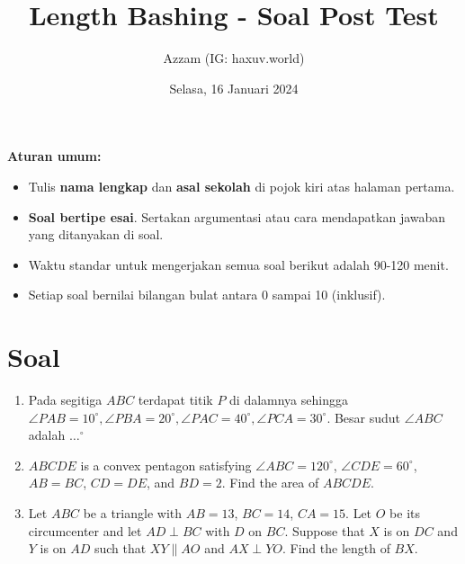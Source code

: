 \documentclass[11pt]{scrartcl}
\title{Length Bashing - Soal Post Test}
\author{Azzam (IG: haxuv.world)}
\date{Selasa, 16 Januari 2024}
\begin{document}
\maketitle
\textbf{Aturan umum:}
\begin{itemize}
    \item Tulis \textbf{nama lengkap} dan \textbf{asal sekolah} di pojok kiri atas halaman pertama.
    \item \textbf{Soal bertipe esai}. Sertakan argumentasi atau cara mendapatkan jawaban yang ditanyakan di soal.
    \item Waktu standar untuk mengerjakan semua soal berikut adalah 90-120 menit.
    \item Setiap soal bernilai bilangan bulat antara 0 sampai 10 (inklusif).
\end{itemize}


\section{Soal}
\begin{enumerate}
    \item Pada segitiga $ABC$ terdapat titik $P$ di dalamnya sehingga $\angle PAB = 10^\circ, \angle PBA = 20^\circ , \angle PAC = 40^\circ, \angle PCA = 30^\circ$. Besar sudut $\angle ABC$ adalah $\dots^\circ$ 
    
    \item $ABCDE$ is a convex pentagon satisfying $\angle ABC = 120^\circ$, $\angle CDE = 60^\circ$, $AB = BC$, $CD = DE$, and $BD = 2$. Find the area of $ABCDE$.

    \item Let $ABC$ be a triangle with $AB = 13$, $BC = 14$, $CA = 15$. Let $O$ be its circumcenter and let $AD \perp BC$ with $D$ on $BC$. Suppose that $X$ is on $DC$ and $Y$ is on $AD$ such that $XY \parallel AO$ and $AX \perp YO$. Find the length of $BX$.
\end{enumerate}
\end{document}
